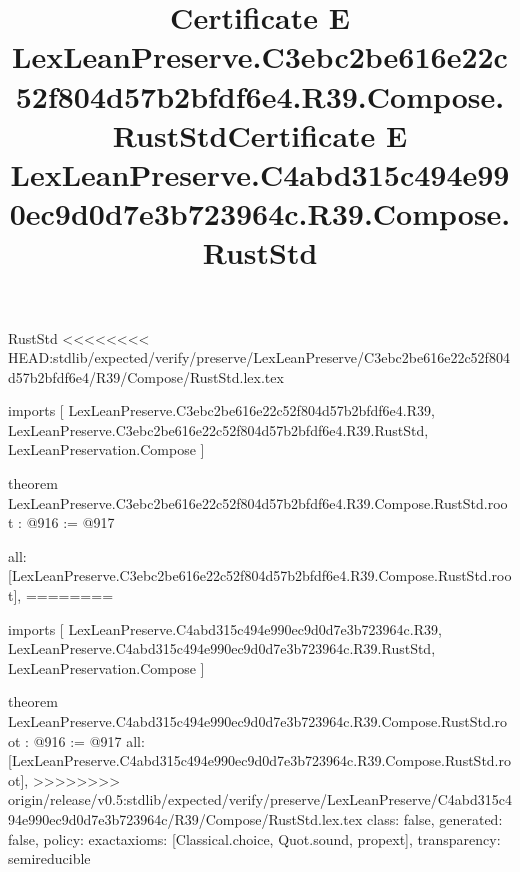 \begin{lexlean}{RustStd}
<<<<<<<< HEAD:stdlib/expected/verify/preserve/LexLeanPreserve/C3ebc2be616e22c52f804d57b2bfdf6e4/R39/Compose/RustStd.lex.tex
\title{Certificate E LexLeanPreserve.C3ebc2be616e22c52f804d57b2bfdf6e4.R39.Compose.RustStd}
\begin{coremodule}
imports [
  LexLeanPreserve.C3ebc2be616e22c52f804d57b2bfdf6e4.R39,
  LexLeanPreserve.C3ebc2be616e22c52f804d57b2bfdf6e4.R39.RustStd,
  LexLeanPreservation.Compose
]

theorem LexLeanPreserve.C3ebc2be616e22c52f804d57b2bfdf6e4.R39.Compose.RustStd.root : @916 := @917 {
  all: [LexLeanPreserve.C3ebc2be616e22c52f804d57b2bfdf6e4.R39.Compose.RustStd.root],
========
\title{Certificate E LexLeanPreserve.C4abd315c494e990ec9d0d7e3b723964c.R39.Compose.RustStd}
\begin{coremodule}
imports [
  LexLeanPreserve.C4abd315c494e990ec9d0d7e3b723964c.R39,
  LexLeanPreserve.C4abd315c494e990ec9d0d7e3b723964c.R39.RustStd,
  LexLeanPreservation.Compose
]

theorem LexLeanPreserve.C4abd315c494e990ec9d0d7e3b723964c.R39.Compose.RustStd.root : @916 := @917 {
  all: [LexLeanPreserve.C4abd315c494e990ec9d0d7e3b723964c.R39.Compose.RustStd.root],
>>>>>>>> origin/release/v0.5:stdlib/expected/verify/preserve/LexLeanPreserve/C4abd315c494e990ec9d0d7e3b723964c/R39/Compose/RustStd.lex.tex
  class: false,
  generated: false,
  policy: exact{axioms: [Classical.choice, Quot.sound, propext]},
  transparency: semireducible
}


\end{coremodule}}
\end{coremodule}
\end{lexlean}
